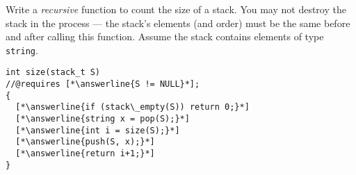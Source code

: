 
Write a \emph{recursive} function to count the size of a stack. You
may not destroy the stack in the process --- the stack's elements (and
order) must be the same before and after calling this function. Assume
the stack contains elements of type \lstinline{string}.

\begin{lstlisting}[lineskip=2ex]
int size(stack_t S)
//@requires [*\answerline{S != NULL}*];
{
  [*\answerline{if (stack\_empty(S)) return 0;}*]
  [*\answerline{string x = pop(S);}*]
  [*\answerline{int i = size(S);}*]
  [*\answerline{push(S, x);}*]
  [*\answerline{return i+1;}*]
}
\end{lstlisting}
